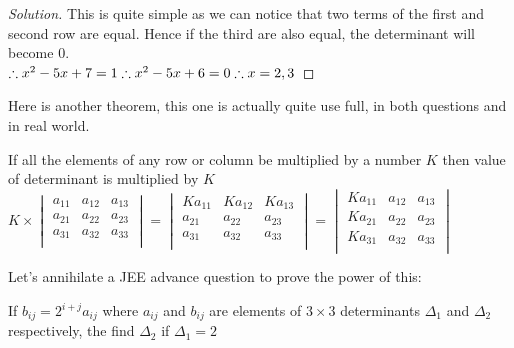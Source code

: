 \begin{proof}
    [Solution]
    This is quite simple as we can notice that two terms of the first and second row are equal. Hence if the third are also equal, the determinant will become 0.\\
    $\therefore x^2-5x+7=1\\
    \therefore x^2-5x+6=0\\
    \therefore x=2,3$
\end{proof}
Here is another theorem, this one is actually quite use full, in both questions and in real world.\\
\begin{theorem}
     If all the elements of any row or column be multiplied by a number $K$ then value of determinant is multiplied by $K$\\
     $K \times \begin{vmatrix}
    a_{11} & a_{12} & a_{13} \\
    a_{21} & a_{22} & a_{23} \\
    a_{31} & a_{32} & a_{33} \\
\end{vmatrix} = \begin{vmatrix}
    Ka_{11} & Ka_{12} & Ka_{13} \\
    a_{21} & a_{22} & a_{23} \\
    a_{31} & a_{32} & a_{33} \\
\end{vmatrix}= \begin{vmatrix}
    Ka_{11} & a_{12} & a_{13} \\
    Ka_{21} & a_{22} & a_{23} \\
    Ka_{31} & a_{32} & a_{33} \\
\end{vmatrix}$
\end{theorem}
Let's annihilate a JEE advance question to prove the power of this:\\
\begin{example}
     If $b_{ij} = 2^{i+j}a_{ij}$ where $a_{ij}$ and $b_{ij}$ are elements of $3 \times 3$ determinants $\Delta_1$ and $\Delta_2$ respectively, the find $\Delta_2$ if $\Delta_1= 2$
\end{example}
